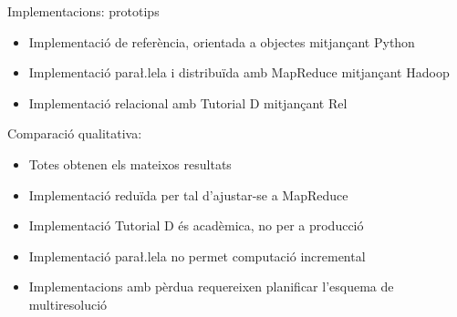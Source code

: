 \begin{frame}{Implementacions: prototips}

  \begin{itemize}
  \item Implementació de referència, orientada a objectes mitjançant Python
  \item Implementació para\l.lela i distribuïda amb MapReduce mitjançant Hadoop
  \item Implementació relacional amb Tutorial D mitjançant Rel
  \end{itemize}



Comparació qualitativa:

  \begin{itemize}
  \item Totes obtenen els mateixos resultats
  \item Implementació reduïda per tal d'ajustar-se a MapReduce
  \item Implementació Tutorial D és acadèmica, no per a producció
  \item Implementació para\l.lela no permet computació incremental
  \item Implementacions amb pèrdua requereixen planificar l'esquema de multiresolució
  \end{itemize}


\end{frame}


